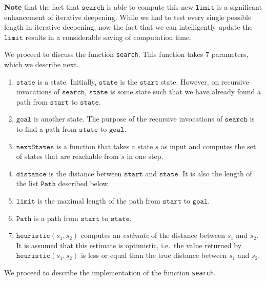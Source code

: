 \begin{enumerate}
\begin{enumerate}
            \textbf{Note} that the fact that $\mathtt{search}$ is able to compute this new $\mathtt{limit}$ is
            a significant enhancement of iterative deepening.  While we had to test every single possible
            length in iterative deepening, now the fact that we can intelligently update the $\mathtt{limit}$
            results in a considerable saving of computation time.
      \end{enumerate}
\end{enumerate}
We proceed to discuss the function \texttt{search}. This function takes 7 parameters, which we describe next.
\begin{enumerate}
\item $\mathtt{state}$ is a state.  Initially, $\mathtt{state}$ is the $\mathtt{start}$ state.  However,
      on recursive invocations of $\mathtt{search}$, $\mathtt{state}$ is some state such that we have already
      found a path from $\mathtt{start}$ to $\mathtt{state}$.
\item $\mathtt{goal}$ is another state.  The purpose of the recursive invocations of $\mathtt{search}$ is to
      find a path from $\mathtt{state}$ to $\mathtt{goal}$.
\item $\mathtt{nextStates}$ is a function that takes a state $s$ as input and computes the set of states that are
      reachable from $s$ in one step. 
\item $\mathtt{distance}$ is the distance between  $\mathtt{start}$ and $\mathtt{state}$.  It is also the
      length of the list $\mathtt{Path}$ described below.
\item $\mathtt{limit}$ is the maximal length of the path from $\mathtt{start}$ to $\mathtt{goal}$.
\item $\mathtt{Path}$ is a path from $\mathtt{start}$ to $\mathtt{state}$.
\item $\texttt{heuristic}(s_1, s_2)$ computes an \emph{estimate} of the distance between $s_1$ and $s_2$.  It is
      assumed that this estimate is optimistic, i.e.~the value returned by $\mathtt{heuristic}(s_1, s_2)$ 
      is less or equal than the true distance between $s_1$ and $s_2$.
\end{enumerate}
We proceed to describe the implementation of the function \texttt{search}.
